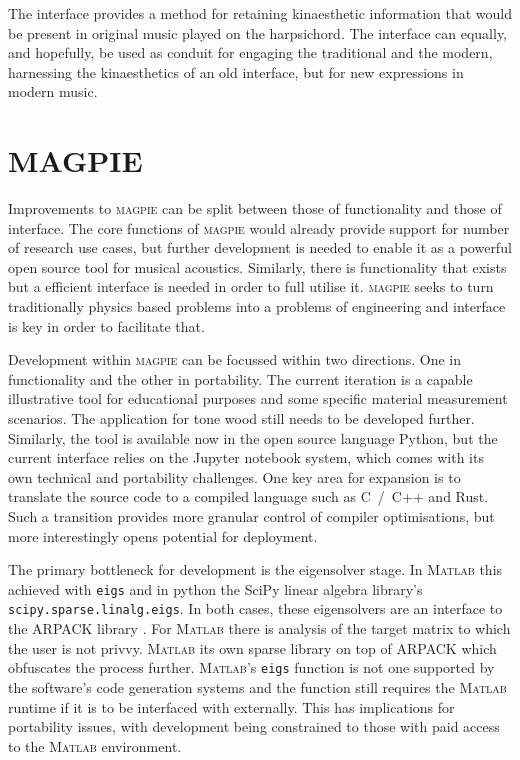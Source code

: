 The interface provides a method for retaining kinaesthetic information that
would be present in original music played on the harpsichord. The interface can
equally, and hopefully, be used as conduit for engaging the traditional and the
modern, harnessing the kinaesthetics of an old interface, but for new
expressions in modern music.

\section{MAGPIE}\label{sec:future-magpie}

Improvements to \textsc{magpie} can be split between those of functionality and
those of interface. The core functions of \textsc{magpie} would already provide
support for number of research use cases, but further development is needed to
enable it as a powerful open source tool for musical acoustics. Similarly, there
is functionality that exists but a efficient interface is needed in order to
full utilise it. \textsc{magpie} seeks to turn traditionally physics based
problems into a problems of engineering and interface is key in order to
facilitate that.

Development within \textsc{magpie} can be focussed within two directions. One in
functionality and the other in portability. The current iteration is a capable
illustrative tool for educational purposes and some specific material
measurement scenarios. The application for tone wood still needs to be developed
further. Similarly, the tool is available now in the open source language
Python, but the current interface relies on the Jupyter notebook system, which
comes with its own technical and portability challenges. One key area for
expansion is to translate the source code to a compiled language such as
\textsc{C}~/~\textsc{C++} and Rust. Such a transition provides more granular
control of compiler optimisations, but more interestingly opens potential for
deployment.

The primary bottleneck for development is the eigensolver stage. In
M\textsc{atlab} this achieved with \texttt{eigs} and in python the SciPy linear
algebra library's \texttt{scipy.sparse.linalg.eigs}. In both cases, these
eigensolvers are an interface to the ARPACK library \cite{lehoucq_arpack_1998}.
For M\textsc{atlab} there is analysis of the target matrix to which the user is
not privvy. M\textsc{atlab} its own sparse library on top of ARPACK
\cite{gilbert_sparse_1992} which obfuscates the process further.
M\textsc{atlab}'s \texttt{eigs} function is not one supported by the software's
code generation systems and the function still requires the M\textsc{atlab}
runtime if it is to be interfaced with externally. This has implications for
portability issues, with development being constrained to those with paid access
to the M\textsc{atlab} environment.

